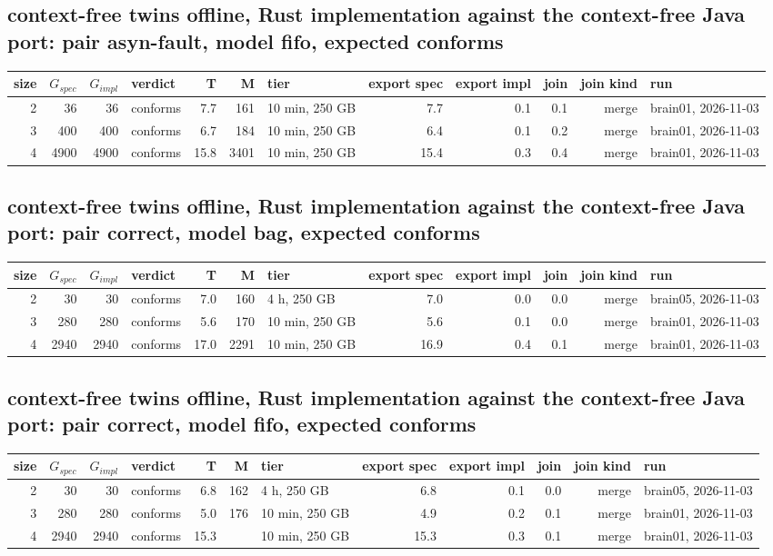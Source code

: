 \documentclass[10pt]{article}
\begin{document}
\subsection*{context-free twins offline, Rust implementation against the context-free Java port: pair \textsf{asyn-fault}, model fifo, expected conforms}
\begin{longtable}{@{}rrrlrrlrrrrl@{}}
\toprule
size & $G_{\mathit{spec}}$ & $G_{\mathit{impl}}$ & verdict & T & M & tier & export spec & export impl & join & join kind & run \\
\midrule
\endhead
\color{blue} 2 & 36 & 36 & conforms & 7.7 & 161 & 10 min, 250 GB & 7.7 & 0.1 & 0.1 & merge & brain01, 2026-11-03 \\
\color{blue} 3 & 400 & 400 & conforms & 6.7 & 184 & 10 min, 250 GB & 6.4 & 0.1 & 0.2 & merge & brain01, 2026-11-03 \\
\color{blue} 4 & 4900 & 4900 & conforms & 15.8 & 3401 & 10 min, 250 GB & 15.4 & 0.3 & 0.4 & merge & brain01, 2026-11-03 \\
\bottomrule
\end{longtable}
\subsection*{context-free twins offline, Rust implementation against the context-free Java port: pair \textsf{correct}, model bag, expected conforms}
\begin{longtable}{@{}rrrlrrlrrrrl@{}}
\toprule
size & $G_{\mathit{spec}}$ & $G_{\mathit{impl}}$ & verdict & T & M & tier & export spec & export impl & join & join kind & run \\
\midrule
\endhead
\color{blue} 2 & 30 & 30 & conforms & 7.0 & 160 & 4 h, 250 GB & 7.0 & 0.0 & 0.0 & merge & brain05, 2026-11-03 \\
\color{blue} 3 & 280 & 280 & conforms & 5.6 & 170 & 10 min, 250 GB & 5.6 & 0.1 & 0.0 & merge & brain01, 2026-11-03 \\
\color{blue} 4 & 2940 & 2940 & conforms & 17.0 & 2291 & 10 min, 250 GB & 16.9 & 0.4 & 0.1 & merge & brain01, 2026-11-03 \\
\bottomrule
\end{longtable}
\subsection*{context-free twins offline, Rust implementation against the context-free Java port: pair \textsf{correct}, model fifo, expected conforms}
\begin{longtable}{@{}rrrlrrlrrrrl@{}}
\toprule
size & $G_{\mathit{spec}}$ & $G_{\mathit{impl}}$ & verdict & T & M & tier & export spec & export impl & join & join kind & run \\
\midrule
\endhead
\color{blue} 2 & 30 & 30 & conforms & 6.8 & 162 & 4 h, 250 GB & 6.8 & 0.1 & 0.0 & merge & brain05, 2026-11-03 \\
\color{blue} 3 & 280 & 280 & conforms & 5.0 & 176 & 10 min, 250 GB & 4.9 & 0.2 & 0.1 & merge & brain01, 2026-11-03 \\
\color{blue} 4 & 2940 & 2940 & conforms & 15.3 &  & 10 min, 250 GB & 15.3 & 0.3 & 0.1 & merge & brain01, 2026-11-03 \\
\bottomrule
\end{longtable}
\end{document}
